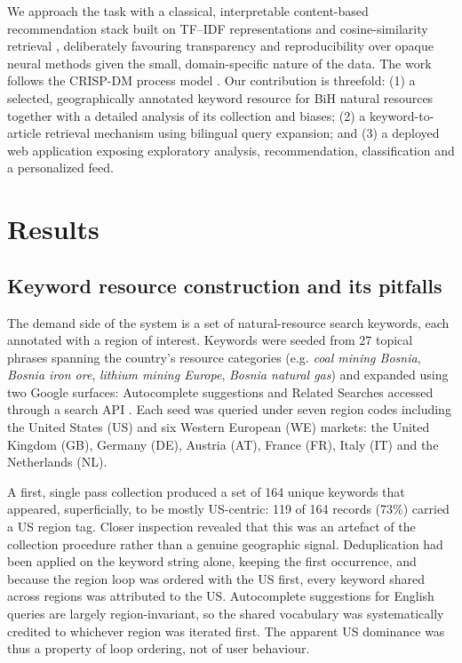 \documentclass[fleqn,10pt]{wlscirep}
\begin{document}
We approach the task with a classical, interpretable content-based recommendation stack \cite{lops2011content,aggarwal2016recommender} built on TF--IDF representations \cite{salton1988term,jones1972statistical} and cosine-similarity retrieval \cite{manning2008introduction}, deliberately favouring transparency and reproducibility over opaque neural methods \cite{devlin2019bert} given the small, domain-specific nature of the data. The work follows the CRISP-DM process model \cite{wirth2000crisp}. Our contribution is threefold: (1) a selected, geographically annotated keyword resource for BiH natural resources together with a detailed analysis of its collection and biases; (2) a keyword-to-article retrieval mechanism using bilingual query expansion; and (3) a deployed web application exposing exploratory analysis, recommendation, classification and a personalized feed.

\section*{Results}

\subsection*{Keyword resource construction and its pitfalls}

The demand side of the system is a set of natural-resource search keywords, each annotated with a region of interest. Keywords were seeded from 27 topical phrases spanning the country's resource categories (e.g. \emph{coal mining Bosnia}, \emph{Bosnia iron ore}, \emph{lithium mining Europe}, \emph{Bosnia natural gas}) and expanded using two Google surfaces: Autocomplete suggestions and Related Searches accessed through a search API \cite{serpapi2024}. Each seed was queried under seven region codes including the United States (US) and six Western European (WE) markets: the United Kingdom (GB), Germany (DE), Austria (AT), France (FR), Italy (IT) and the Netherlands (NL).

A first, single pass collection produced a set of 164 unique keywords that appeared, superficially, to be mostly US-centric: 119 of 164 records (73\%) carried a US region tag. Closer inspection revealed that this was an artefact of the collection procedure rather than a genuine geographic signal. Deduplication had been applied on the keyword string alone, keeping the first occurrence, and because the region loop was ordered with the US first, every keyword shared across regions was attributed to the US. Autocomplete suggestions for English queries are largely region-invariant, so the shared vocabulary was systematically credited to whichever region was iterated first. The apparent US dominance was thus a property of loop ordering, not of user behaviour.
\end{document}
